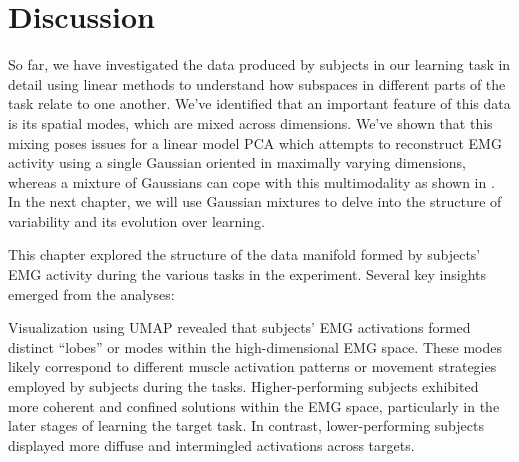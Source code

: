 \documentclass[../main.tex]{subfiles}
\begin{document}


\section{Discussion}

So far, we have investigated the data produced by subjects in our learning task in detail using linear methods to understand how subspaces in different parts of the task relate to one another. We've identified that an important feature of this data is its spatial modes, which are mixed across dimensions. We've shown that this mixing poses issues for a linear model PCA which attempts to reconstruct EMG activity using a single Gaussian oriented in maximally varying dimensions, whereas a mixture of Gaussians can cope with this multimodality as shown in . In the next chapter, we will use Gaussian mixtures to delve into the structure of variability and its evolution over learning.

This chapter explored the structure of the data manifold formed by subjects' EMG activity during the various tasks in the experiment. Several key insights emerged from the analyses:

Visualization using UMAP revealed that subjects' EMG activations formed distinct ``lobes'' or modes within the high-dimensional EMG space. These modes likely correspond to different muscle activation patterns or movement strategies employed by subjects during the tasks.
Higher-performing subjects exhibited more coherent and confined solutions within the EMG space, particularly in the later stages of learning the target task. In contrast, lower-performing subjects displayed more diffuse and intermingled activations across targets.
\end{document}
